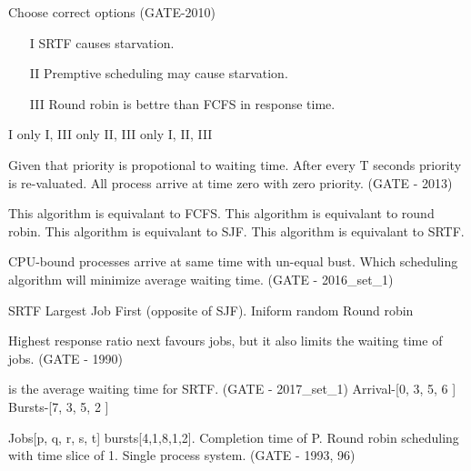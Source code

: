   \question Choose correct options (GATE-2010)

   \begin{enumerate}
      \item[I] SRTF causes starvation.
      \item[II] Premptive scheduling may cause starvation.
      \item[III] Round robin is bettre than FCFS in response time.
   \end{enumerate}

  \begin{choices}
    \choice I only
    \choice I, III only
    \choice II, III only
    \choice I, II, III
  \end{choices}

  \question  Given that priority is propotional to waiting time. After every T seconds priority is re-valuated.
             All process arrive at time zero with zero priority. (GATE - 2013)

  \begin{choices}
    \choice This algorithm is equivalant to FCFS.
    \choice This algorithm is equivalant to round robin.
    \choice This algorithm is equivalant to SJF.
    \choice This algorithm is equivalant to SRTF.
  \end{choices}


\begin{minipage}{\linewidth}

  \question  CPU-bound processes arrive at same time with un-equal bust.
            Which scheduling algorithm will minimize average waiting time. (GATE - 2016\_set\_1)

  \begin{choices}
    \choice SRTF
    \choice Largest Job First (opposite of SJF).
    \choice Iniform random
    \choice Round robin
  \end{choices}
\end{minipage}


  \question Highest response ratio next favours   jobs, but it also limits the
            waiting time of  jobs. (GATE - 1990)

  \question \fillin[.........] is the average waiting time for SRTF. (GATE - 2017\_set\_1) \newline
            [P1, P2, P3, P4]
            Arrival-[0,  3,  5,  6 ]
            Bursts-[7,  3,  5,  2 ]


  \question Jobs[p, q, r, s, t] bursts[4,1,8,1,2]. Completion time of P. Round robin scheduling with time slice of 1.
            Single process system. (GATE - 1993, 96)

